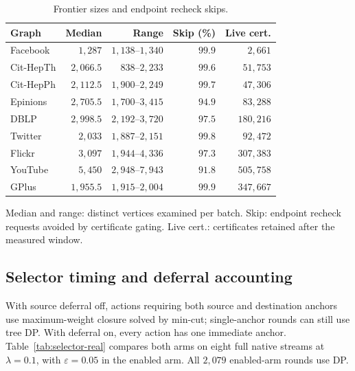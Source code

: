 \begin{table}[tb]\centering
\caption{Frontier sizes and endpoint recheck skips.}
\label{tab:frontier}
\begin{scriptsize}
\setlength{\tabcolsep}{0.2em}
\begin{tabular*}{\linewidth}{@{\extracolsep{\fill}}lrrrr@{}}
\toprule
Graph & Median & Range & Skip (\%) & Live cert. \\
\midrule
Facebook & $1{,}287$ & $1{,}138$--$1{,}340$ & $99.9$ & $2{,}661$ \\
Cit-HepTh & $2{,}066.5$ & $838$--$2{,}233$ & $99.6$ & $51{,}753$ \\
Cit-HepPh & $2{,}112.5$ & $1{,}900$--$2{,}249$ & $99.7$ & $47{,}306$ \\
Epinions & $2{,}705.5$ & $1{,}700$--$3{,}415$ & $94.9$ & $83{,}288$ \\
DBLP & $2{,}998.5$ & $2{,}192$--$3{,}720$ & $97.5$ & $180{,}216$ \\
Twitter & $2{,}033$ & $1{,}887$--$2{,}151$ & $99.8$ & $92{,}472$ \\
Flickr & $3{,}097$ & $1{,}944$--$4{,}336$ & $97.3$ & $307{,}383$ \\
YouTube & $5{,}450$ & $2{,}948$--$7{,}943$ & $91.8$ & $505{,}758$ \\
GPlus & $1{,}955.5$ & $1{,}915$--$2{,}004$ & $99.9$ & $347{,}667$ \\
\bottomrule
\end{tabular*}
\par\smallskip\raggedright
Median and range: distinct vertices examined per batch.
Skip: endpoint recheck requests avoided by certificate gating.
Live cert.: certificates retained after the measured window.
\end{scriptsize}
\end{table}

\subsection{Selector timing and deferral accounting}\label{app:defer-seltime}

With source deferral off, actions requiring both source and destination
anchors use maximum-weight closure solved by min-cut; single-anchor rounds
can still use tree DP. With deferral on, every action has one immediate
anchor. Table~\ref{tab:selector-real} compares both arms on eight full native
streams at $\lambda=0.1$, with $\varepsilon=0.05$ in the enabled arm.
All $2{,}079$ enabled-arm rounds use DP.

